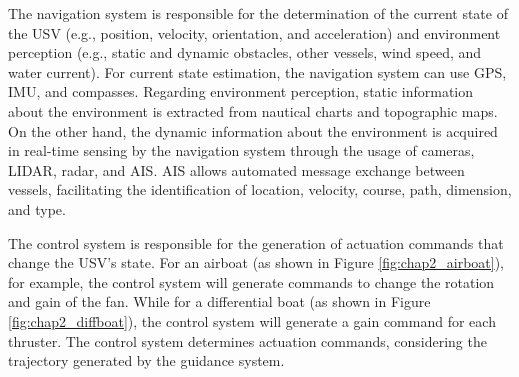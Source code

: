     
    The navigation system is responsible for the determination of the current state of the USV (e.g., position, velocity, orientation, and acceleration) and environment perception (e.g., static and dynamic obstacles, other vessels, wind speed, and water current). For current state estimation, the navigation system can use GPS, \ac{IMU}, and compasses. Regarding environment perception, static information about the environment is extracted from nautical charts and topographic maps. On the other hand, the dynamic information about the environment is acquired in real-time sensing by the navigation system through the usage of cameras, \ac{LIDAR}, radar, and \ac{AIS}. \ac{AIS} allows automated message exchange between vessels, facilitating the identification of location, velocity, course, path, dimension, and type.
    
    The control system is responsible for the generation of actuation commands that change the \ac{USV}'s state. For an airboat (as shown in Figure \ref{fig:chap2_airboat}), for example, the control system will generate commands to change the rotation and gain of the fan. While for a differential boat (as shown in Figure \ref{fig:chap2_diffboat}), the control system will generate a gain command for each thruster. The control system determines actuation commands, considering the trajectory generated by the guidance system.
    
